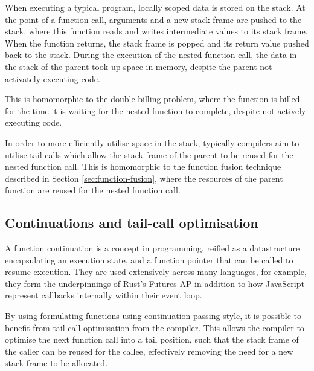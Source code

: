 When executing a typical program, locally scoped data is stored on the stack. At the point of a function call, arguments and a new stack frame are pushed to the stack, where this function reads and writes intermediate values to its stack frame. When the function returns, the stack frame is popped and its return value pushed back to the stack. During the execution of the nested function call, the data in the stack of the parent took up space in memory, despite the parent not activately executing code.

This is homomorphic to the double billing problem, where the function is billed for the time it is waiting for the nested function to complete, despite not actively executing code.

In order to more efficiently utilise space in the stack, typically compilers aim to utilise tail calls which allow the stack frame of the parent to be reused for the nested function call. This is homomorphic to the function fusion technique described in Section \ref{sec:function-fusion}, where the resources of the parent function are reused for the nested function call.

\subsection{Continuations and tail-call optimisation}
A function continuation is a concept in programming\cite{sussmanSCHEMEInterpreterExtended1975}, reified as a datastructure encapsulating an execution state, and a function pointer that can be called to resume execution. They are used extensively across many languages, for example, they form the underpinnings of Rust's Futures AP in addition to how JavaScript represent callbacks internally within their event loop.

By using formulating functions using continuation passing style, it is possible to benefit from tail-call optimisation from the compiler. This allows the compiler to optimise the next function call into a tail position, such that the stack frame of the caller can be reused for the callee, effectively removing the need for a new stack frame to be allocated.
